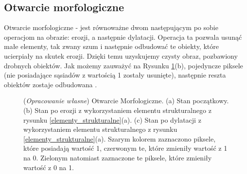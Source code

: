 \documentclass{article}
\begin{document}
        \subsection{Otwarcie morfologiczne}
        {
            \label{sec:otwarcie-morfologiczne}
            \Large
            \justifying
            \quad
            Otwarcie morfologiczne - jest równoważne dwom następującym po sobie operacjom na obrazie: erozji, a następnie dylatacji.
            Operacja ta pozwala usunąć małe elementy, tak zwany szum i następnie odbudować te obiekty, które ucierpiały na skutek erozji.
            Dzięki temu uzyskujemy czysty obraz, pozbawiony drobnych obiektów.
            Jak możemy zauważyć na Rysunku \ref{Otwarcie_Morfologiczne}(b), pojedyncze piksele (nie posiadające sąsiadów z wartością 1 zostały usunięte), następnie reszta obiektów zostaje odbudowana \cite{Digital Image Processing Second Edition}.
        }
        \begin{figure}[H]
            \centering
            \qquad
            \qquad
            \caption
            {
                (\textit{Opracowanie własne}) Otwarcie Morfologiczne.
                (a) Stan początkowy.
                (b) Stan po erozji z wykorzystaniem elementu strukturalnego z rysunku \ref{elementy_strukturalne}(a).
                (c) Stan po dylatacji z wykorzystaniem elementu strukturalnego z rysunku \ref{elementy_strukturalne}(a).
                Szarym kolorem zaznaczono piksele, które posiadają wartość 1, czerwonym te, które zmieniły wartość z 1 na 0. Zielonym natomiast zaznaczone te piksele, które zmieniły wartość z 0 na 1.
            }
            \label{Otwarcie_Morfologiczne}
        \end{figure}
\end{document}

